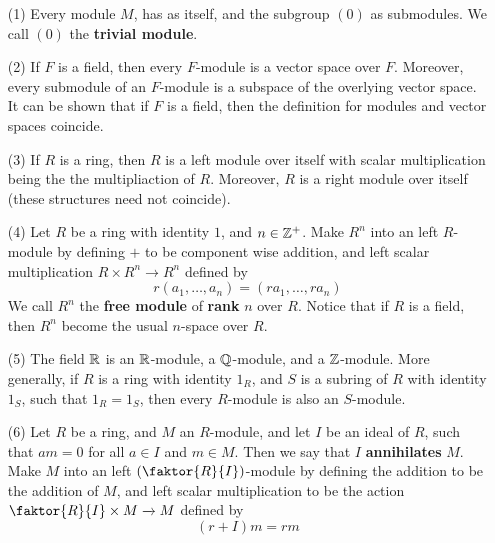 \begin{example}\label{}
    \begin{enumerate}
        \item[(1)] Every module $M$, has as itself, and the subgroup $(0)$ as
            submodules. We call $(0)$ the \textbf{trivial module}.

        \item[(2)] If $F$ is a field, then every  $F$-module is a vector space
            over $F$. Moreover, every submodule of an  $F$-module is a subspace
            of the overlying vector space. It can be shown that if  $F$ is a
            field, then the definition for modules and vector spaces coincide.

        \item[(3)] If $R$ is a ring, then  $R$ is a left module over itself with
            scalar multiplication being the the multipliaction of $R$. Moreover,
            $R$ is a right module over itself (these structures need not
            coincide).

        \item[(4)] Let $R$ be a ring with identity  $1$, and  $n \in \mathbb{Z}^+$. Make
             $R^n$ into an left $R$-module by defining $+$ to be component wise
             addition, and left scalar multiplication $R \times R^n
             \xrightarrow{} R^n$ defined by
             \begin{equation*}
                 r(a_1, \dots, a_n)=(ra_1, \dots, ra_n)
             \end{equation*}
             We call $R^n$ the  \textbf{free module} of \textbf{rank} $n$ over
             $R$. Notice that if  $R$ is a field, then $R^n$ become the usual
             $n$-space over $R$.

         \item[(5)] The field $\mathbb{R}$ is an  $\mathbb{R}$-module, a  $\mathbb{Q}$-module, and a
             $\mathbb{Z}$-module. More generally, if $R$ is a ring with identity $1_R$,
             and $S$ is a subring of $R$ with identity $1_S$, such that $1_R=1_S$,
             then every  $R$-module is also an  $S$-module.

         \item[(6)] Let $R$ be a ring, and  $M$ an  $R$-module, and let  $I$ be
             an ideal of  $R$, such that  $am=0$ for all  $a \in I$ and  $m \in
             M$. Then we say that  $I$  \textbf{annihilates} $M$. Make $M$ into
             an left $(\faktor{R}{I})$-module by defining the addition to be the
             addition of $M$, and left scalar multiplication to be the action
             $\faktor{R}{I} \times M \xrightarrow{} M$ defined by
             \begin{equation*}
                 (r+I)m=rm
             \end{equation*}


\end{enumerate}
\end{example}
